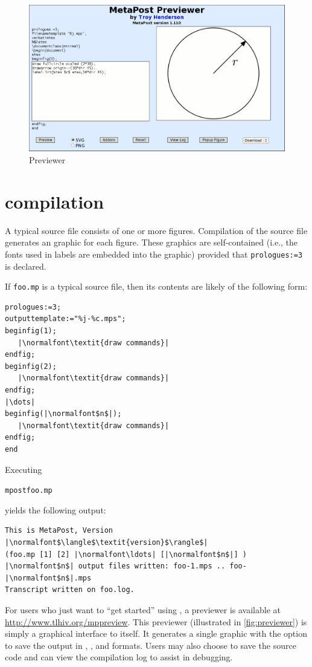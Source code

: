 \begin{figure}[tp]
  \centering
  \includegraphics[width=\textwidth]{previewer}
  \caption{\MP{} Previewer}
  \label{fig:previewer}
\end{figure}

\section{\MP{} compilation}
\label{sec:mpcompilation}

A typical \MP{} source file consists of one or more figures.
Compilation of the source file generates an \EPS{} graphic for each
figure.  These \EPS{} graphics are self-contained (i.e., the fonts used
in labels are embedded into the graphic) provided that
\lstinline{prologues:=3} is declared.

If \texttt{foo.mp} is a typical \MP{} source file, then its contents are
likely of the following form:

\begin{lstlisting}[xleftmargin=1.25\parindent]
prologues:=3;
outputtemplate:="%j-%c.mps";
beginfig(1);
   |\normalfont\textit{draw commands}|
endfig;
beginfig(2);
   |\normalfont\textit{draw commands}|
endfig;
|\dots|
beginfig(|\normalfont$n$|);
   |\normalfont\textit{draw commands}|
endfig;
end
\end{lstlisting}

Executing
\begin{flushleft}
  \hspace*{1.25\parindent}\texttt{mpostfoo.mp}
\end{flushleft}
yields the following output:

\begin{lstlisting}[xleftmargin=1.25\parindent]
This is MetaPost, Version |\normalfont$\langle$\textit{version}$\rangle$|
(foo.mp [1] [2] |\normalfont\ldots| [|\normalfont$n$|] )
|\normalfont$n$| output files written: foo-1.mps .. foo-|\normalfont$n$|.mps
Transcript written on foo.log.
\end{lstlisting}

For users who just want to ``get started'' using \MP{}, a \MP{}
previewer is available at \url{http://www.tlhiv.org/mppreview}.  This
previewer (illustrated in \autoref{fig:previewer}) is simply a graphical
interface to \MP{} itself.  It generates a single graphic with the
option to save the output in \EPS{}, \PDF{}, and \SVG{} formats.  Users
may also choose to save the source code and can view the compilation log
to assist in debugging.
